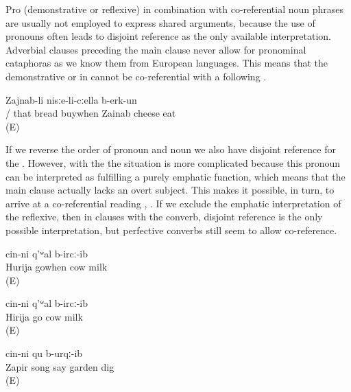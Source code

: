 Pro (demonstrative or reflexive) in combination with co-referential noun phrases are usually not employed to express shared arguments, because the use of pronouns often leads to disjoint reference as the only available interpretation. Adverbial clauses preceding the main clause never allow for pronominal cataphoras as we know them from European languages. This means that the demonstrative or  in  cannot be co-referential with a following .
%
\begin{exe}
	\ex	\label{ex:‎When s/he bought bread, Zainab ate (it) with cheese}
	\gll	[cin-ni	/	it-i-l	t'ult'	asː-ib=qːel]	Zajnab-li	nisːe-li-cːella	b-erk-un\\
			/	that	bread	buywhen	Zainab	cheese	eat\\
	\glt	{} (E)
\end{exe}

If we reverse the order of pronoun and noun we also have disjoint reference for the  . However, with the  the situation is more complicated because this pronoun can be interpreted as fulfilling a purely emphatic function, which means that the main clause actually lacks an overt subject. This makes it possible, in turn, to arrive at a co-referential reading , . If we exclude the emphatic interpretation of the reflexive, then in clauses with the  converb, disjoint reference is the only possible interpretation, but perfective converbs still seem to allow co-reference. 
%
\begin{exe}
	\ex	\label{ex:‎When Hurija came, s/he milked the cow1}
	\gll	[ħuˁrija	sa-r-eʁ-ib=qːel]	cin-ni	q'ʷal	b-ircː-ib\\
		Hurija	gowhen		cow	milk\\
	\glt	{} (E)

	\ex	\label{ex:‎When Hurija came, s/he milked the cow2}
	\gll	[ħuˁrija	sa-r-eʁ-ib-le]	cin-ni	q'ʷal	b-ircː-ib\\
		Hirija	go		cow	milk\\
	\glt	{} (E)

	\ex	\label{ex:‎While Zapir was singing a song while he dug the field}
		cin-ni	qu	b-urqː-ib\\
		Zapir	song	say		garden	dig\\
	\glt	{} (E)
\end{exe}

